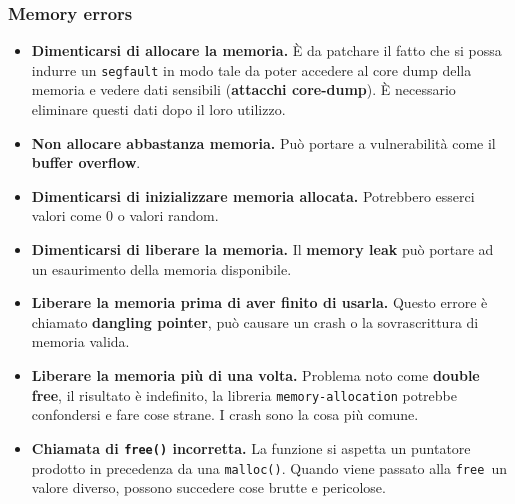 \documentclass[12pt, twoside, letterpaper]{article}
\begin{document}
			\subsubsection{Memory errors}
				\begin{itemize}
					\item \textbf{Dimenticarsi di allocare la memoria.} È da patchare il fatto che si possa indurre un \texttt{segfault} in modo tale da poter accedere al core dump della memoria e vedere dati sensibili (\textbf{attacchi core-dump}). È necessario eliminare questi dati dopo il loro utilizzo. 
					\item \textbf{Non allocare abbastanza memoria.} Può portare a vulnerabilità come il \textbf{buffer overflow}.
					\item \textbf{Dimenticarsi di inizializzare memoria allocata.} Potrebbero esserci valori come 0 o valori random.
					\item \textbf{Dimenticarsi di liberare la memoria.} Il \textbf{memory leak} può portare ad un esaurimento della memoria disponibile.
					\item \textbf{Liberare la memoria prima di aver finito di usarla.} Questo errore è chiamato \textbf{dangling pointer}, può causare un crash o la sovrascrittura di memoria valida.
					\item \textbf{Liberare la memoria più di una volta.} Problema noto come \textbf{double free}, il risultato è indefinito, la libreria \texttt{memory-allocation} potrebbe confondersi e fare cose strane. I crash sono la cosa più comune.
					\item \textbf{Chiamata di \texttt{free()} incorretta.} La funzione si aspetta un puntatore prodotto in precedenza da una \texttt{malloc()}. Quando viene passato alla \texttt{free }un valore diverso, possono succedere cose brutte e pericolose.
				\end{itemize}
				
\end{document}
